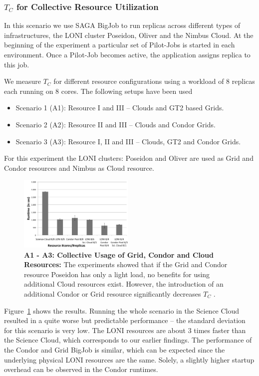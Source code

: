 \documentclass[conference,final]{IEEEtran}
\newcommand{\up}{\vspace*{-1em}}
\newcommand{\tc}{$T_{C}$ }
\begin{document}
\subsubsection{\tc for Collective Resource Utilization}

In this scenario we use SAGA BigJob to run replicas across
different types of infrastructures, the LONI
cluster Poseidon, Oliver and the Nimbus Cloud. 
At the beginning of the experiment a particular set of
Pilot-Jobs is started in each environment. Once a Pilot-Job becomes
active, the application assigns replica to this job. 

We measure \tc for different resource configurations using a workload
of 8 replicas each running on 8 cores. The following setups have been used
\begin{itemize}
\item Scenario 1 (A1): Resource I and III -- Clouds and GT2 based Grids. 
\item Scenario 2 (A2): Resource II and III -- Clouds and Condor Grids.
\item Scenario 3 (A3): Resource I, II and III -- Clouds, GT2 and Condor Grids.
\end{itemize} 
For this experiment the LONI clusters: Poseidon and Oliver are used as Grid and Condor resources and
Nimbus as Cloud resource.

\begin{figure}[htbp]
    \centering
        \includegraphics[width=0.49\textwidth]{performance/8replica_scenario_grid_condor_cloud}
        \caption{\textbf{A1 - A3: Collective Usage of Grid, Condor and
            Cloud Resources: } The experiments showed that if the Grid
          and Condor resource Poseidon has only a light load, no
          benefits for using additional Cloud resources
          exist. However, the introduction of an additional Condor
          or Grid resource significantly decreases \tc.\up}
    \label{fig:performance_8replica_grid_cloud_condor}
\end{figure}

Figure~\ref{fig:performance_8replica_grid_cloud_condor} shows the results. 
Running the whole scenario in the Science Cloud resulted
in a quite worse but predictable performance -- the standard deviation for this scenario
is very low. The LONI resources are about 3 times faster than
the Science Cloud, which corresponds to our earlier findings. 
The performance of the Condor and Grid BigJob is similar, which can 
be expected since the underlying physical LONI resources are the same. 
Solely, a slightly higher startup overhead can be observed in the Condor runtimes.
\end{document}
